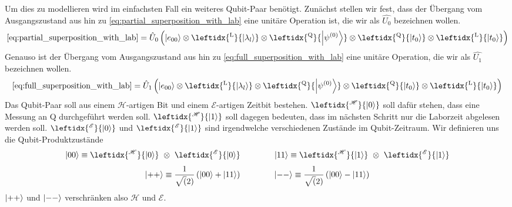 \documentclass[12pt]{article}
\begin{document}
Um dies zu modellieren wird im einfachsten Fall ein weiteres Qubit-Paar benötigt. Zunächst stellen wir fest, dass der Übergang vom Ausgangszustand aus hin zu   \eqref{eq:partial_superposition_with_lab} eine unitäre Operation ist, die wir als $\hat{U_0}$ bezeichnen wollen.
\begin{equation}
\eqref{eq:partial_superposition_with_lab} = \hat{U}_0
\left(
\ket{e_{00}} 
\otimes \leftidx{^\mathrm{L}}{\ket{\lambda_l}} 
\otimes \leftidx{^\mathrm{Q}}{\ket{\psi^{(0)}}}
\otimes \leftidx{^\mathrm{Q}}{\ket{t_0}}
\otimes \leftidx{^\mathrm{L}}{\ket{t_0}}
\right)
\end{equation} 
Genauso ist der Übergang vom Ausgangszustand aus hin zu \eqref{eq:full_superposition_with_lab} eine unitäre Operation, die wir als $\hat{U_1}$ bezeichnen wollen.
\begin{equation}
\eqref{eq:full_superposition_with_lab} = \hat{U}_1
\left(
\ket{e_{00}} 
\otimes \leftidx{^\mathrm{L}}{\ket{\lambda_l}} 
\otimes \leftidx{^\mathrm{Q}}{\ket{\psi^{(0)}}}
\otimes \leftidx{^\mathrm{Q}}{\ket{t_0}}
\otimes \leftidx{^\mathrm{L}}{\ket{t_0}}
\right)
\end{equation} 
Das Qubit-Paar soll aus einem $\mathscr{H}$-artigen Bit und einem $\mathscr{E}$-artigen Zeitbit bestehen. $\leftidx{^\mathscr{H}}{\ket{0}}$ soll dafür stehen, dass eine Messung an Q durchgeführt werden soll. $\leftidx{^\mathscr{H}}{\ket{1}}$ soll dagegen bedeuten, dass im nächsten Schritt nur die Laborzeit abgelesen werden soll. $\leftidx{^\mathscr{E}}{\ket{0}}$ und $\leftidx{^\mathscr{E}}{\ket{1}}$ sind irgendwelche verschiedenen Zustände im Qubit-Zeitraum. Wir definieren uns die Qubit-Produktzustände
\begin{equation*}
\ket{00} \equiv \leftidx{^\mathscr{H}}{\ket{0}}\ \otimes\ \leftidx{^\mathscr{E}}{\ket{0}}
\quad\quad\quad\quad
\ket{11} \equiv \leftidx{^\mathscr{H}}{\ket{1}}\ \otimes\ \leftidx{^\mathscr{E}}{\ket{1}}
\end{equation*}
\begin{equation*}
\ket{++} \equiv \frac{1}{\sqrt(2)}\left(\ket{00}+\ket{11}\right)
\quad\quad\quad\quad
\ket{--} \equiv \frac{1}{\sqrt(2)}\left(\ket{00}-\ket{11}\right)
\end{equation*}
$\ket{++}$ und $\ket{--}$ verschränken also $\mathscr{H}$ und $\mathscr{E}$.
\end{document}
